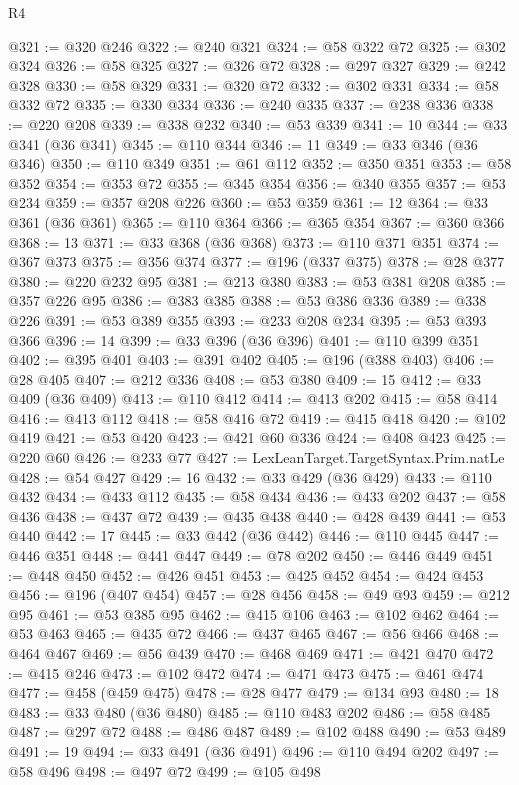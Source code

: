 \begin{lexlean}{R4}
\begin{coremodule}
@321 := @320 @246
@322 := @240 @321
@324 := @58 @322 @72
@325 := @302 @324
@326 := @58 @325
@327 := @326 @72
@328 := @297 @327
@329 := @242 @328
@330 := @58 @329
@331 := @320 @72
@332 := @302 @331
@334 := @58 @332 @72
@335 := @330 @334
@336 := @240 @335
@337 := @238 @336
@338 := @220 @208
@339 := @338 @232
@340 := @53 @339
@341 := 10
@344 := @33 @341 (@36 @341)
@345 := @110 @344
@346 := 11
@349 := @33 @346 (@36 @346)
@350 := @110 @349
@351 := @61 @112
@352 := @350 @351
@353 := @58 @352
@354 := @353 @72
@355 := @345 @354
@356 := @340 @355
@357 := @53 @234
@359 := @357 @208 @226
@360 := @53 @359
@361 := 12
@364 := @33 @361 (@36 @361)
@365 := @110 @364
@366 := @365 @354
@367 := @360 @366
@368 := 13
@371 := @33 @368 (@36 @368)
@373 := @110 @371 @351
@374 := @367 @373
@375 := @356 @374
@377 := @196 (@337 @375)
@378 := @28 @377
@380 := @220 @232 @95
@381 := @213 @380
@383 := @53 @381 @208
@385 := @357 @226 @95
@386 := @383 @385
@388 := @53 @386 @336
@389 := @338 @226
@391 := @53 @389 @355
@393 := @233 @208 @234
@395 := @53 @393 @366
@396 := 14
@399 := @33 @396 (@36 @396)
@401 := @110 @399 @351
@402 := @395 @401
@403 := @391 @402
@405 := @196 (@388 @403)
@406 := @28 @405
@407 := @212 @336
@408 := @53 @380
@409 := 15
@412 := @33 @409 (@36 @409)
@413 := @110 @412
@414 := @413 @202
@415 := @58 @414
@416 := @413 @112
@418 := @58 @416 @72
@419 := @415 @418
@420 := @102 @419
@421 := @53 @420
@423 := @421 @60 @336
@424 := @408 @423
@425 := @220 @60
@426 := @233 @77
@427 := LexLeanTarget.TargetSyntax.Prim.natLe
@428 := @54 @427
@429 := 16
@432 := @33 @429 (@36 @429)
@433 := @110 @432
@434 := @433 @112
@435 := @58 @434
@436 := @433 @202
@437 := @58 @436
@438 := @437 @72
@439 := @435 @438
@440 := @428 @439
@441 := @53 @440
@442 := 17
@445 := @33 @442 (@36 @442)
@446 := @110 @445
@447 := @446 @351
@448 := @441 @447
@449 := @78 @202
@450 := @446 @449
@451 := @448 @450
@452 := @426 @451
@453 := @425 @452
@454 := @424 @453
@456 := @196 (@407 @454)
@457 := @28 @456
@458 := @49 @93
@459 := @212 @95
@461 := @53 @385 @95
@462 := @415 @106
@463 := @102 @462
@464 := @53 @463
@465 := @435 @72
@466 := @437 @465
@467 := @56 @466
@468 := @464 @467
@469 := @56 @439
@470 := @468 @469
@471 := @421 @470
@472 := @415 @246
@473 := @102 @472
@474 := @471 @473
@475 := @461 @474
@477 := @458 (@459 @475)
@478 := @28 @477
@479 := @134 @93
@480 := 18
@483 := @33 @480 (@36 @480)
@485 := @110 @483 @202
@486 := @58 @485
@487 := @297 @72
@488 := @486 @487
@489 := @102 @488
@490 := @53 @489
@491 := 19
@494 := @33 @491 (@36 @491)
@496 := @110 @494 @202
@497 := @58 @496
@498 := @497 @72
@499 := @105 @498

\end{coremodule}
\end{lexlean}
